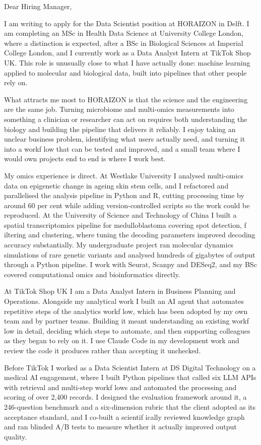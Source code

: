 \documentclass[letterpaper,11pt]{article}
\begin{document}
Dear Hiring Manager,

I am writing to apply for the Data Scientist position at HORAIZON in Delft. I am completing an MSc in Health Data Science at University College London, where a distinction is expected, after a BSc in Biological Sciences at Imperial College London, and I currently work as a Data Analyst Intern at TikTok Shop UK. This role is unusually close to what I have actually done: machine learning applied to molecular and biological data, built into pipelines that other people rely on.

What attracts me most to HORAIZON is that the science and the engineering are the same job. Turning microbiome and multi-omics measurements into something a clinician or researcher can act on requires both understanding the biology and building the pipeline that delivers it reliably. I enjoy taking an unclear business problem, identifying what users actually need, and turning it into a workf\kern0pt low that can be tested and improved, and a small team where I would own projects end to end is where I work best.

My omics experience is direct. At Westlake University I analysed multi-omics data on epigenetic change in ageing skin stem cells, and I refactored and parallelised the analysis pipeline in Python and R, cutting processing time by around 60 per cent while adding version-controlled scripts so the work could be reproduced. At the University of Science and Technology of China I built a spatial transcriptomics pipeline for medulloblastoma covering spot detection, f\kern0pt iltering and clustering, where tuning the decoding parameters improved decoding accuracy substantially. My undergraduate project ran molecular dynamics simulations of rare genetic variants and analysed hundreds of gigabytes of output through a Python pipeline. I work with Seurat, Scanpy and DESeq2, and my BSc covered computational omics and bioinformatics directly.

At TikTok Shop UK I am a Data Analyst Intern in Business Planning and Operations. Alongside my analytical work I built an AI agent that automates repetitive steps of the analytics workf\kern0pt low, which has been adopted by my own team and by partner teams. Building it meant understanding an existing workf\kern0pt low in detail, deciding which steps to automate, and then supporting colleagues as they began to rely on it. I use Claude Code in my development work and review the code it produces rather than accepting it unchecked.

Before TikTok I worked as a Data Scientist Intern at DS Digital Technology on a medical AI engagement, where I built Python pipelines that called six LLM APIs with retrieval and multi-step workf\kern0pt lows and automated the processing and scoring of over 2,400 records. I designed the evaluation framework around it, a 246-question benchmark and a six-dimension rubric that the client adopted as its acceptance standard, and I co-built a scientif\kern0pt ically reviewed knowledge graph and ran blinded A/B tests to measure whether it actually improved output quality.
\end{document}
